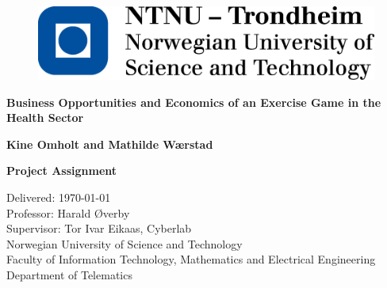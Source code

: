 \documentclass[b5paper,twoside,openright,11pt]{report}
\begin{document}
\begin{flushleft}
\begin{figure}[htb]
\includegraphics[scale=0.6]{NTNU-logo}
\end{figure}
\bigskip
\bigskip
\bigskip
\bigskip
\begin{huge}
\textbf{Business Opportunities and Economics of an Exercise Game in the Health Sector}\\
\end{huge} 
\bigskip
\bigskip
\bigskip
\bigskip
\bigskip
\bigskip
\bigskip
\begin{Large}
\textbf{Kine Omholt and Mathilde Wærstad \\}
\end{Large}
\bigskip
\bigskip
\bigskip
\bigskip
\bigskip
\bigskip
\begin{large}
\textbf{Project Assignment\\}
\end{large}
Delivered: \today\\
Professor: Harald Øverby\\
Supervisor: Tor Ivar Eikaas, Cyberlab\\
\bigskip
\bigskip
\bigskip
\bigskip
\bigskip
Norwegian University of Science and Technology\\ 
Faculty of Information Technology, Mathematics and Electrical Engineering\\
Department of Telematics
\end{flushleft}
\cleardoublepage
\end{document}
